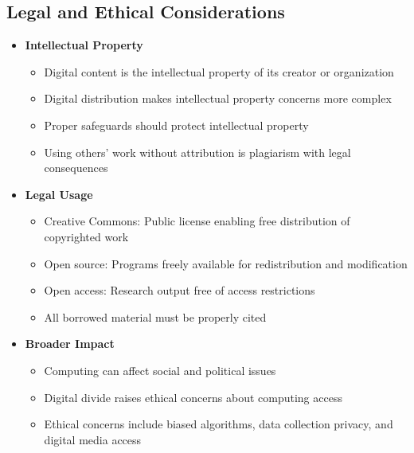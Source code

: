 \subsection*{Legal and Ethical Considerations}
\begin{itemize}
    \item \textbf{Intellectual Property}
        \begin{itemize}
            \item Digital content is the intellectual property of its creator or organization %
            \item Digital distribution makes intellectual property concerns more complex %
            \item Proper safeguards should protect intellectual property %
            \item Using others' work without attribution is plagiarism with legal consequences %
        \end{itemize}
    
    \item \textbf{Legal Usage}
        \begin{itemize}
            \item Creative Commons: Public license enabling free distribution of copyrighted work
            \item Open source: Programs freely available for redistribution and modification
            \item Open access: Research output free of access restrictions %
            \item All borrowed material must be properly cited %
        \end{itemize}

    \item \textbf{Broader Impact}
        \begin{itemize}
            \item Computing can affect social and political issues %
            \item Digital divide raises ethical concerns about computing access %
            \item Ethical concerns include biased algorithms, data collection privacy, and digital media access %
        \end{itemize}
\end{itemize}